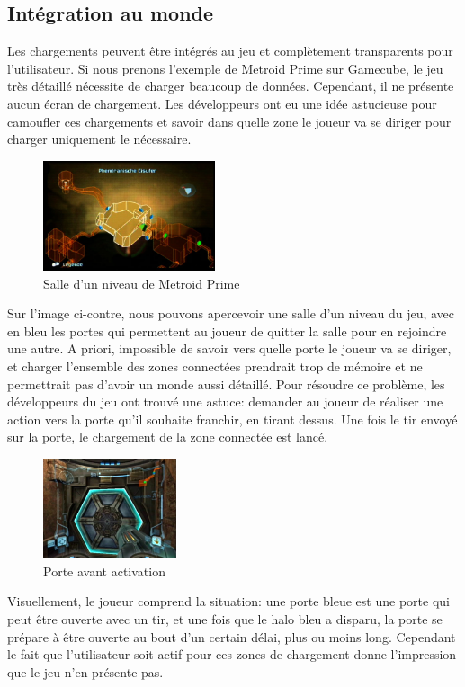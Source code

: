\documentclass[a4paper, 11pt]{article} %
\begin{document}
\newpage
\subsection*{Intégration au monde}
Les chargements peuvent être intégrés au jeu et complètement transparents pour l'utilisateur. Si nous prenons l'exemple de Metroid Prime sur Gamecube, le jeu très détaillé nécessite de charger beaucoup de données. Cependant, il ne présente aucun écran de chargement. Les développeurs ont eu une idée astucieuse pour camoufler ces chargements et savoir dans quelle zone le joueur va se diriger pour charger uniquement le nécessaire.

\begin{figure}
\begin{center}
\includegraphics[width=0.45\textwidth]{images/metroid-prime_map.png}
\end{center}
\caption{Salle d'un niveau de Metroid Prime}
\end{figure}

Sur l'image ci-contre, nous pouvons apercevoir une salle d'un niveau du jeu, avec en bleu les portes qui permettent au joueur de quitter la salle pour en rejoindre une autre. A priori, impossible de savoir vers quelle porte le joueur va se diriger, et charger l'ensemble des zones connectées prendrait trop de mémoire et ne permettrait pas d'avoir un monde aussi détaillé. Pour résoudre ce problème, les développeurs du jeu ont trouvé une astuce: demander au joueur de réaliser une action vers la porte qu'il souhaite franchir, en tirant dessus. Une fois le tir envoyé sur la porte, le chargement de la zone connectée est lancé.

\begin{figure}
\begin{center}
\includegraphics[width=0.35\textwidth]{images/metroid-prime_door.png}
\end{center}
\caption{Porte avant activation}
\end{figure}
Visuellement, le joueur comprend la situation: une porte bleue est une porte qui peut être ouverte avec un tir, et une fois que le halo bleu a disparu, la porte se prépare à être ouverte au bout d'un certain délai, plus ou moins long. Cependant le fait que l'utilisateur soit actif pour ces zones de chargement donne l'impression que le jeu n'en présente pas.
\end{document}
